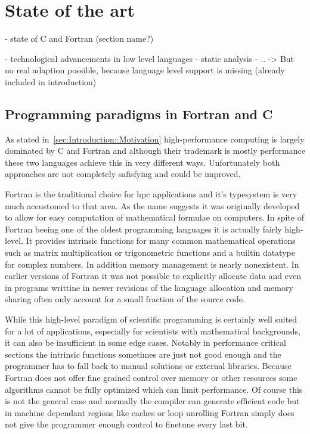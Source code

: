 \chapter{State of the art}
\label{ch:State_of_the_art}


- state of C and Fortran (section name?)

- technological advancements in low level languages
    - static analysis
    - ..
    -> But no real adaption possible, because language level support is missing (already included in introduction)

\section{Programming paradigms in Fortran and C} %
\label{sec:State_of_the_art::Paradigms}

As stated in~\autoref{sec:Introduction::Motivation} high-performance computing is largely dominated by C and Fortran and although their trademark is mostly performance these two languages achieve this in very different ways. Unfortunately both approaches are not completely safisfying and could be improved.

Fortran is the traditional choice for \gls{hpc} applications and it's typesystem is very much accustomed to that area. As the name suggests it was originally developed to allow for easy computation of mathematical formulae on computers. In spite of Fortran beeing one of the oldest programming languages it is actually fairly high-level. It provides \gls{intrinsic} functions for many common mathematical operations such as matrix multiplication or trigonometric functions and a builtin datatype for complex numbers. In addition memory management is nearly nonexistent. In earlier versions of Fortran it was not possible to explicitly allocate data and even in programs writtine in newer revisions of the language allocation and memory sharing often only account for a small fraction of the source code.

While this high-level paradigm of scientific programming is certainly well suited for a lot of applications, especially for scientists with mathematical backgrounds, it can also be insufficient in some edge cases. Notably in performance critical sections the \gls{intrinsic} functions sometimes are just not good enough and the programmer has to fall back to manual solutions or external libraries. Because Fortran does not offer fine grained control over memory or other resources some algorithms cannot be fully optimized which can limit performance. Of course this is not the general case and normally the compiler can generate efficient code but in machine dependant regions like caches or loop unrolling Fortran simply does not give the programmer enough control to finetune every last bit.

